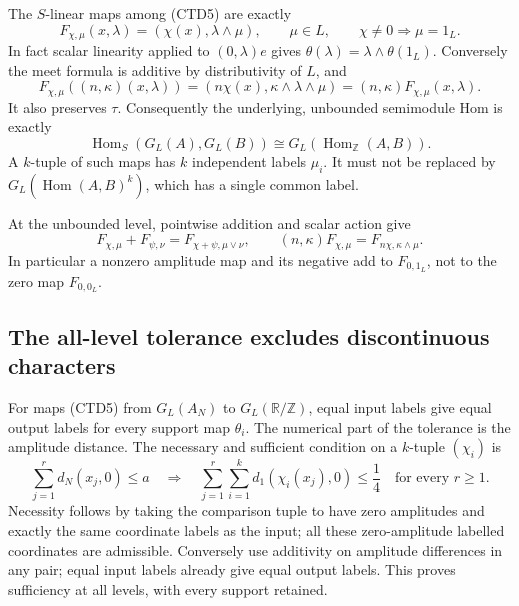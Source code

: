 The $S$-linear maps among (CTD5) are exactly
\begin{equation}\tag{CTD6}
F_{\chi,\mu}(x,\lambda)
=(\chi(x),\lambda\wedge\mu),\qquad
\mu\in L,\qquad \chi\ne0\Longrightarrow\mu=1_L.
\end{equation}
In fact scalar linearity applied to $(0,\lambda)e$ gives
$\theta(\lambda)=\lambda\wedge\theta(1_L)$. Conversely the meet
formula is additive by distributivity of $L$, and
\[
F_{\chi,\mu}((n,\kappa)(x,\lambda))
=(n\chi(x),\kappa\wedge\lambda\wedge\mu)
=(n,\kappa)F_{\chi,\mu}(x,\lambda).
\]
It also preserves $\tau$. Consequently the underlying, unbounded
semimodule Hom is exactly
\[
\operatorname{Hom}_S(G_L(A),G_L(B))
 \cong G_L(\operatorname{Hom}_{\mathbb Z}(A,B)).
\]
A $k$-tuple of such maps has $k$ independent labels $\mu_i$.
It must not be replaced by $G_L(\operatorname{Hom}(A,B)^k)$,
which has a single common label.

At the unbounded level, pointwise addition and scalar action give
\begin{equation}\tag{CTD7}
F_{\chi,\mu}+F_{\psi,\nu}=F_{\chi+\psi,\mu\vee\nu},
\qquad
(n,\kappa)F_{\chi,\mu}=F_{n\chi,\kappa\wedge\mu}.
\end{equation}
In particular a nonzero amplitude map and its negative add to
$F_{0,1_L}$, not to the zero map $F_{0,0_L}$.

\subsection{The all-level tolerance excludes discontinuous characters}

For maps (CTD5) from $G_L(A_N)$ to $G_L(\mathbb R/\mathbb Z)$,
equal input labels give equal output labels for every support
map $\theta_i$. The numerical part of the tolerance is the
amplitude distance. The
necessary and sufficient condition on a $k$-tuple $(\chi_i)$ is
\begin{equation}\tag{CTD8}
\sum_{j=1}^r d_N(x_j,0)\le a
\quad\Longrightarrow\quad
\sum_{j=1}^r\sum_{i=1}^k d_1(\chi_i(x_j),0)\le\frac14
\quad\text{for every }r\ge1.
\end{equation}
Necessity follows by taking the comparison tuple to have zero
amplitudes and exactly the same coordinate labels as the input;
all these zero-amplitude labelled coordinates are admissible.
Conversely use additivity on amplitude differences in any pair;
equal input labels already give equal output labels.
This proves sufficiency at all levels, with every support retained.


